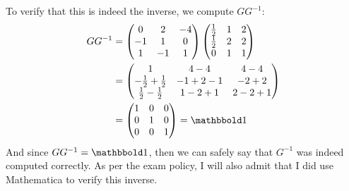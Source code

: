 \documentclass[10pt]{article}
\begin{document}
\begin{enumerate}[label=\alph*)]
\begin{solution}
\[				\] 
				To verify that this is indeed the inverse, we compute $GG^{-1}$:
				\begin{align*}
					GG^{-1} &= \begin{pmatrix} 0 & 2 & -4\\-1 &1 & 0\\ 1& -1 & 1 \end{pmatrix} \begin{pmatrix} \frac{1}{2} & 1 & 2\\ \frac{1}{2} & 2 & 2\\ 0 & 1 & 1 \end{pmatrix}  \\
							&= \begin{pmatrix} 1 & 4-4 & 4- 4 \\ -\frac{1}{2} + \frac{1}{2} & -1 +2 - 1 & -2 + 2\\\frac{1}{2} - \frac{1}{2} & 1 - 2 + 1 & 2 - 2 +1 \end{pmatrix}  \\
							&= \begin{pmatrix} 1 & 0&0\\0&1&0\\0&0&1 \end{pmatrix}  = \mathbbold 1
				\end{align*}
				And since $GG^{-1} = \mathbbold 1$, then we can safely say that $G^{-1}$ was indeed computed
				correctly. As per the exam policy, I will also admit that I did use Mathematica to verify
				this inverse. 
			\end{solution}
	\end{enumerate}

	\pagebreak
\end{document}
